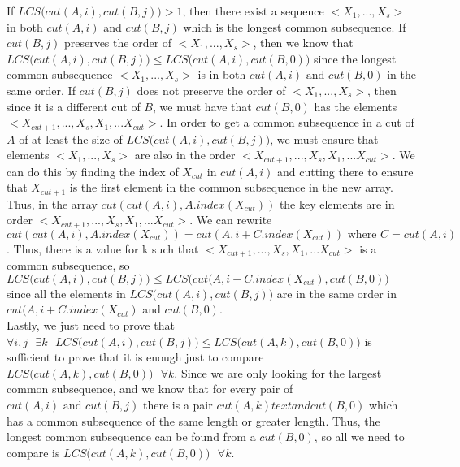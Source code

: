\documentclass[12pt]{article}
\begin{document}
\begin{enumerate}[label=(\alph*)]
    If $LCS\big(cut(A,i), cut(B,j)\big) > 1$, then there exist a sequence $<X_1,...,X_s>$ in both $cut(A,i)$ and $cut(B,j)$ which is the longest common subsequence. If $cut(B,j)$ preserves the order of $<X_1,...,X_s>$, then we know that $LCS\big(cut(A,i), cut(B,j)\big) \le LCS\big(cut(A,i), cut(B,0)\big)$ since the longest common subsequence $<X_1,...,X_s>$ is in both $cut(A,i) \text{ and } cut(B,0)$ in the same order. If $cut(B,j)$ does not preserve the order of $<X_1,...,X_s>$, then since it is a different cut of $B$, we must have that $cut(B,0)$ has the elements $<X_{cut+1},...,X_s,X_1,...X_{cut}>$. In order to get a common subsequence in a cut of $A$ of at least the size of $LCS\big(cut(A,i), cut(B,j)\big)$, we must ensure that elements $<X_1,...,X_s>$ are also in the order $<X_{cut+1},...,X_s,X_1,...X_{cut}>$. We can do this by finding the index of $X_{cut}$ in $cut(A,i)$ and cutting there to ensure that $X_{cut+1}$ is the first element in the common subsequence in the new array. Thus, in the array $cut(cut(A,i),A.index(X_{cut}))$ the key elements are in order $<X_{cut+1},...,X_s,X_1,...X_{cut}>$. We can rewrite $cut(cut(A,i),A.index(X_{cut})) = cut(A,i+C.index(X_{cut})) \text{ where } C = cut(A,i)$. Thus, there is a value for k such that $<X_{cut+1},...,X_s,X_1,...X_{cut}>$ is a common subsequence, so $LCS\big(cut(A,i), cut(B,j)\big) \le LCS\big(cut(A,i+C.index(X_{cut}), cut(B,0)\big)$ since all the elements in $LCS\big(cut(A,i), cut(B,j)\big)$ are in the same order in $cut(A,i+C.index(X_{cut})$ and $cut(B,0)$.\\
    Lastly, we just need to prove that $\forall i,j \text{ } \exists k \text{ } LCS\big(cut(A,i), cut(B,j)\big) \le LCS\big(cut(A,k), cut(B,0)\big)$ is sufficient to prove that it is enough just to compare $LCS\big(cut(A,k), cut(B,0)\big)\text{ }\forall k$. Since we are only looking for the largest common subsequence, and we know that for every pair of $cut(A,i) \text{ and } cut(B,j)$ there is a pair $cut(A,k) text{ and } cut(B,0)$ which has a common subsequence of the same length or greater length. Thus, the longest common subsequence can be found from a $cut(B,0)$, so all we need to compare is $LCS\big(cut(A,k), cut(B,0)\big)\text{ }\forall k$.
    

\end{enumerate}
\end{document}
